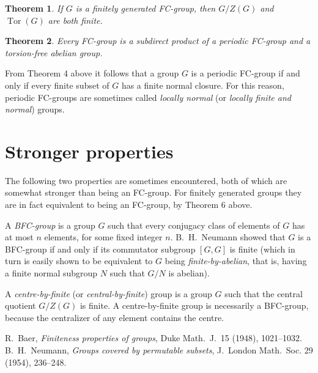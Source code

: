 \documentclass[12pt]{article}
\newtheorem{theorem}{Theorem}
\DeclareMathOperator{\Tor}{Tor}
\begin{document}
\begin{theorem}
If $G$ is a finitely generated FC-group,
then $G/Z(G)$ and $\Tor(G)$ are both finite.
\end{theorem}

\begin{theorem}
Every FC-group is a subdirect product of a periodic FC-group
and a torsion-free abelian group.
\end{theorem}

From Theorem 4 above it follows that a group $G$ is a periodic FC-group
if and only if every finite subset of $G$ has a finite normal closure.
For this reason, periodic FC-groups are sometimes called \emph{locally normal} (or \emph{locally finite and normal}) groups.

\section*{Stronger properties}

The following two properties are sometimes encountered,
both of which are somewhat stronger than being an FC-group.
For finitely generated groups they are in fact equivalent to being an FC-group,
by Theorem 6 above.

A \emph{BFC-group} is a group $G$ such that every conjugacy class of elements of $G$ has at most $n$ elements, for some fixed integer $n$.
B.~H.~Neumann showed\cite{neumann} that $G$ is a BFC-group if and only if its commutator subgroup $[G,G]$ is finite
(which in turn is easily shown to be equivalent to $G$ being \emph{finite-by-abelian}, that is,
having a finite normal subgroup $N$ such that $G/N$ is abelian).

A \emph{centre-by-finite} (or \emph{central-by-finite}) group
is a group $G$ such that the central quotient $G/Z(G)$ is finite.
A centre-by-finite group is necessarily a BFC-group,
because the centralizer of any element contains the centre.

\begin{thebibliography}{9}
 R.\ Baer,
 {\it Finiteness properties of groups},
 Duke Math.\ J.\ 15 (1948), 1021--1032.
 B.\ H.\ Neumann,
 {\it Groups covered by permutable subsets},
 J.\ London Math.\ Soc. 29 (1954), 236--248.
\end{thebibliography}
\end{document}
